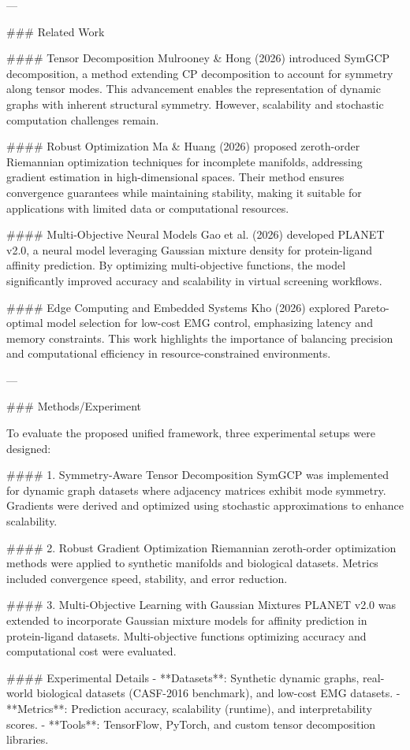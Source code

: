 ---

### Related Work

#### Tensor Decomposition
Mulrooney & Hong (2026) introduced SymGCP decomposition, a method extending CP decomposition to account for symmetry along tensor modes. This advancement enables the representation of dynamic graphs with inherent structural symmetry. However, scalability and stochastic computation challenges remain.

#### Robust Optimization
Ma & Huang (2026) proposed zeroth-order Riemannian optimization techniques for incomplete manifolds, addressing gradient estimation in high-dimensional spaces. Their method ensures convergence guarantees while maintaining stability, making it suitable for applications with limited data or computational resources.

#### Multi-Objective Neural Models
Gao et al. (2026) developed PLANET v2.0, a neural model leveraging Gaussian mixture density for protein-ligand affinity prediction. By optimizing multi-objective functions, the model significantly improved accuracy and scalability in virtual screening workflows.

#### Edge Computing and Embedded Systems
Kho (2026) explored Pareto-optimal model selection for low-cost EMG control, emphasizing latency and memory constraints. This work highlights the importance of balancing precision and computational efficiency in resource-constrained environments.

---

### Methods/Experiment

To evaluate the proposed unified framework, three experimental setups were designed:

#### 1. Symmetry-Aware Tensor Decomposition
SymGCP was implemented for dynamic graph datasets where adjacency matrices exhibit mode symmetry. Gradients were derived and optimized using stochastic approximations to enhance scalability.

#### 2. Robust Gradient Optimization
Riemannian zeroth-order optimization methods were applied to synthetic manifolds and biological datasets. Metrics included convergence speed, stability, and error reduction.

#### 3. Multi-Objective Learning with Gaussian Mixtures
PLANET v2.0 was extended to incorporate Gaussian mixture models for affinity prediction in protein-ligand datasets. Multi-objective functions optimizing accuracy and computational cost were evaluated.

#### Experimental Details
- **Datasets**: Synthetic dynamic graphs, real-world biological datasets (CASF-2016 benchmark), and low-cost EMG datasets.
- **Metrics**: Prediction accuracy, scalability (runtime), and interpretability scores.
- **Tools**: TensorFlow, PyTorch, and custom tensor decomposition libraries.

